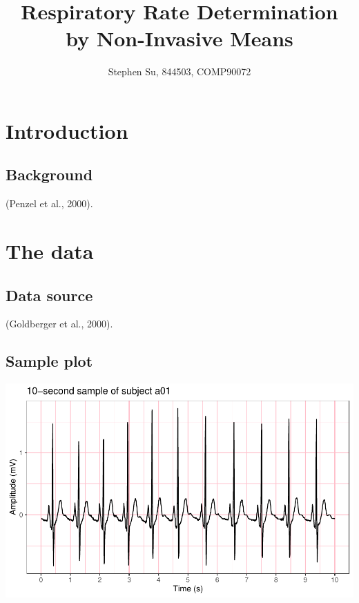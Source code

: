 \documentclass[
]{article}
\title{Respiratory Rate Determination by Non-Invasive Means}
\author{Stephen Su, 844503, COMP90072}
\date{}
\begin{document}
\maketitle

\hypertarget{introduction}{%
\section{Introduction}\label{introduction}}

\hypertarget{background}{%
\subsection{Background}\label{background}}

(Penzel et al., 2000).

\hypertarget{the-data}{%
\section{The data}\label{the-data}}

\hypertarget{data-source}{%
\subsection{Data source}\label{data-source}}

(Goldberger et al., 2000).

\hypertarget{sample-plot}{%
\subsection{Sample plot}\label{sample-plot}}

\begin{center}\includegraphics{report_files/figure-latex/data-1} \end{center}
\end{document}
